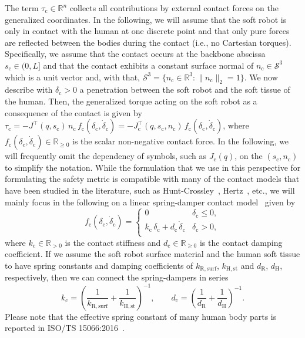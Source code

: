 The term $\tau_\mathrm{c} \in \mathbb{R}^n$ collects all contributions by external contact forces on the generalized coordinates.
In the following, we will assume that the soft robot is only in contact with the human at one discrete point and that only pure forces are reflected between the bodies during the contact (i.e., no Cartesian torques).
Specifically, we assume that the contact occurs at the backbone abscissa $s_\mathrm{c} \in (0, L]$ and that the contact exhibits a constant surface normal of $n_\mathrm{c} \in \mathcal{S}^3$ which is a unit vector and, with that, $\mathcal{S}^3 = \{ n_\mathrm{c} \in \mathbb{R}^3: \lVert n_\mathrm{c} \rVert_2 = 1 \}$.
We now describe with $\delta_\mathrm{c} > 0$ a penetration between the soft robot and the soft tissue of the human.
Then, the generalized torque acting on the soft robot as a consequence of the contact is given by $\tau_\mathrm{c} = -J^\top(q,s_\mathrm{c}) \, n_\mathrm{c} \, f_\mathrm{c}(\delta_\mathrm{c}, \dot{\delta}_\mathrm{c}) = -J_\mathrm{c}^\top(q, s_\mathrm{c}, n_\mathrm{c}) \, f_\mathrm{c}(\delta_\mathrm{c}, \dot{\delta}_\mathrm{c})$, where $f_\mathrm{c}(\delta_\mathrm{c}, \dot{\delta}_\mathrm{c}) \in \mathbb{R}_{\geq 0}$ is the scalar non-negative contact force.
In the following, we will frequently omit the dependency of symbols, such as $J_\mathrm{c}(q)$, on the $(s_\mathrm{c}, n_\mathrm{c})$ to simplify the notation.
While the formulation that we use in this perspective for formulating the safety metric is compatible with many of the contact models that have been studied in the literature, such as Hunt-Crossley~\citep{hunt1975coefficient, aouaj2021predicting}, Hertz~\citep{johnson1987contact, park2011designing, she2020comparative}, etc., we will mainly focus in the following on a linear spring-damper contact model~\citep{iso2016collaborative, haddadin2009requirements} given by
\begin{equation}
    f_\mathrm{c}(\delta_\mathrm{c}, \dot{\delta}_\mathrm{c}) =
    \begin{cases}
        0 & \delta_\mathrm{c} \leq 0,\\
        k_\mathrm{c} \, \delta_\mathrm{c} + d_\mathrm{c} \, \dot{\delta}_\mathrm{c} & \delta_\mathrm{c} > 0,\\
    \end{cases}
\end{equation}
where $k_\mathrm{c} \in \mathbb{R}_{>0}$ is the contact stiffness and $d_\mathrm{c} \in \mathbb{R}_{\geq 0}$ is the contact damping coefficient.
If we assume the soft robot surface material and the human soft tissue to have spring constants and damping coefficients of $k_\mathrm{R,surf}$, $k_\mathrm{H,st}$ and $d_\mathrm{R}$, $d_\mathrm{H}$, respectively, then we can connect the spring-dampers in series
\begin{equation}
    k_\mathrm{c} = \left (\frac{1}{k_\mathrm{R,surf}} + \frac{1}{k_\mathrm{H,st}} \right )^{-1},
    \qquad
    d_\mathrm{c} = \left (\frac{1}{d_\mathrm{R}} + \frac{1}{d_\mathrm{H}} \right )^{-1}.
\end{equation}
Please note that the effective spring constant of many human body parts is reported in ISO/TS 15066:2016~\citep{iso2016collaborative}.

